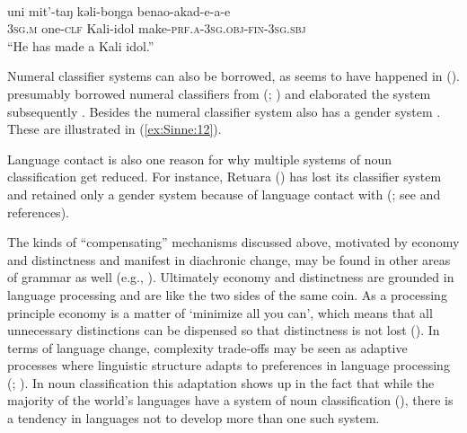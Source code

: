 \documentclass[output=collectionpaper]{langsci/langscibook}
\begin{document}
\ea
\label{ex:Sinne:11}
\\
\gll uni mit'-taŋ kəli-boŋga benao-akad-e-a-e \\
\textsc{3sg.m} one-\textsc{clf} Kali-idol make-\textsc{prf.a-3sg.obj-fin-3sg.sbj}\\
\glt ``He has made a Kali idol.''\\
\z

Numeral classifier systems can also be borrowed, as seems to have happened in  ().  presumably borrowed numeral classifiers from  (; ) and elaborated the system subsequently \citep[117--118]{Emeneau1980}. Besides the numeral classifier system  also has a gender system \citep{Steever1998}. These are illustrated in (\ref{ex:Sinne:12}).

%

Language contact is also one reason for why multiple systems of noun classification get reduced. For instance, Retuara () has lost its classifier system and retained only a gender system because of language contact with  (; see \citealt[386]{Aikhenvald2000} and references).

The kinds of ``compensating'' mechanisms discussed above, motivated by economy and distinctness and manifest in diachronic change, may be found in other areas of grammar as well (e.g., \citealt{Sinnemaeki2014}). Ultimately economy and distinctness are grounded in language processing and are like the two sides of the same coin. As a processing principle economy is a matter of `minimize all you can', which means that all unnecessary distinctions can be dispensed so that distinctness is not lost (\citealt{Bornkessel-Schlesewsky2009}). In terms of language change, complexity trade-offs may be seen as adaptive processes where linguistic structure adapts to preferences in language processing (\citealt{Sinnemaeki2014b}; \citealt{Bickel2015}). In noun classification this adaptation shows up in the fact that while the majority of the world's languages have a system of noun classification (), there is a tendency in languages not to develop more than one such system.
\end{document}

